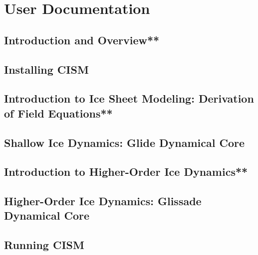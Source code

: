 \mainmatter
\part{User Documentation}

\chapter{Introduction and Overview**}
\newcommand{\dir}{intro}


\chapter{Installing CISM}
\label{chp:install}
\renewcommand{\dir}{install}


\chapter{Introduction to Ice Sheet Modeling: Derivation of Field Equations**}
\renewcommand{\dir}{modeling-intro}


\chapter{Shallow Ice Dynamics: Glide Dynamical Core}
\renewcommand{\dir}{shallow-ice}


\chapter{Introduction to Higher-Order Ice Dynamics**}
\renewcommand{\dir}{higher-order}


\chapter{Higher-Order Ice Dynamics: Glissade Dynamical Core}
\renewcommand{\dir}{glissade}


%

\chapter{Running CISM}
\renewcommand{\dir}{run_cism}


